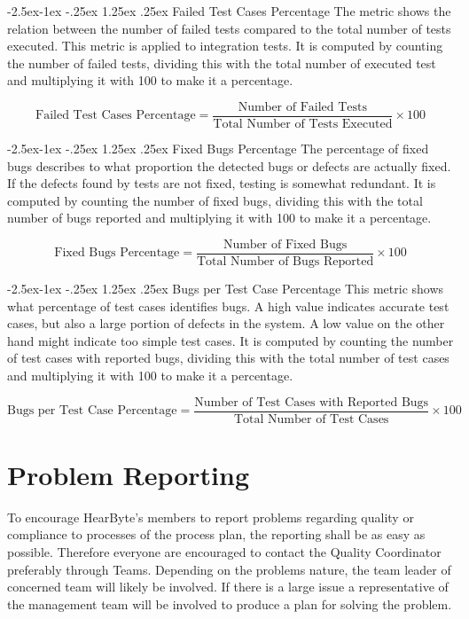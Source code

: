 \documentclass{article}
\makeatletter
\renewcommand\paragraph{\@startsection{paragraph}{4}{\z@}%
	{-2.5ex\@plus -1ex \@minus -.25ex}%
	{1.25ex \@plus .25ex}%
	{\normalfont\normalsize\bfseries}}
\makeatother
\begin{document}
	\paragraph{Failed Test Cases Percentage}
	The metric shows the relation between the number of failed tests compared to the total number of tests executed. This metric is applied to integration tests. It is computed by counting the number of failed tests, dividing this with the total number of executed test and multiplying it with 100 to make it a percentage.
	
	\begin{equation}
		\text{Failed Test Cases Percentage} = \frac{\text{Number of Failed Tests}}{\text{Total Number of Tests Executed}} \times 100
	\end{equation}

	\paragraph{Fixed Bugs Percentage}
	The percentage of fixed bugs describes to what proportion the detected bugs or defects are actually fixed. If the defects found by tests are not fixed, testing is somewhat redundant. It is computed by counting the number of fixed bugs, dividing this with the total number of bugs reported and multiplying it with 100 to make it a percentage. 
	
	\begin{equation}
		\text{Fixed Bugs Percentage} = \frac{\text{Number of Fixed Bugs}}{\text{Total Number of Bugs Reported}} \times 100
	\end{equation}

	\paragraph{Bugs per Test Case Percentage}
	This metric shows what percentage of test cases identifies bugs. A high value indicates accurate test cases, but also a large portion of defects in the system. A low value on the other hand might indicate too simple test cases. It is computed by counting the number of test cases with reported bugs, dividing this with the total number of test cases and multiplying it with 100 to make it a percentage.
	
	\begin{equation}
		\text{Bugs per Test Case Percentage} = \frac{\text{Number of Test Cases with Reported Bugs}}{\text{Total Number of Test Cases}} \times 100
	\end{equation}
	
	\clearpage
	\section{Problem Reporting}
	To encourage HearByte's members to report problems regarding quality or compliance to processes of the process plan, the reporting shall be as easy as possible. Therefore everyone are encouraged to contact the Quality Coordinator preferably through Teams. Depending on the problems nature, the team leader of concerned team will likely be involved. If there is a large issue a representative of the management team will be involved to produce a plan for solving the problem.
	
	
\end{document}

